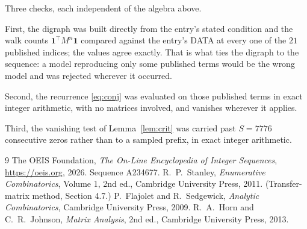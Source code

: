 \documentclass[11pt,a4paper]{article}
\theoremstyle{plain}
\theoremstyle{definition}
\begin{document}
Three checks, each independent of the algebra above.

First, the digraph was built directly from the entry's stated condition and the walk counts
$\mathbf{1}^{\!\top}M^{n}\mathbf{1}$ compared against the entry's DATA at every one of
the $21$ published indices; the values agree exactly. That is what ties the digraph to
the sequence: a model reproducing only some published terms would be the wrong model and
was rejected wherever it occurred.

Second, the recurrence \eqref{eq:conj} was evaluated on those published terms in exact
integer arithmetic, with no matrices involved, and vanishes wherever it applies.

Third, the vanishing test of Lemma~\ref{lem:crit} was carried past $S=7776$ consecutive
zeros rather than to a sampled prefix, in exact integer arithmetic.

\begin{thebibliography}{9}
 The OEIS Foundation, \emph{The On-Line Encyclopedia of Integer
Sequences}, \url{https://oeis.org}, 2026. Sequence A234677.
 R.~P.~Stanley, \emph{Enumerative Combinatorics}, Volume 1, 2nd ed.,
Cambridge University Press, 2011. (Transfer-matrix method, Section 4.7.)
 P.~Flajolet and R.~Sedgewick, \emph{Analytic Combinatorics}, Cambridge
University Press, 2009.
 R.~A.~Horn and C.~R.~Johnson, \emph{Matrix Analysis}, 2nd ed., Cambridge
University Press, 2013.
\end{thebibliography}
\end{document}
